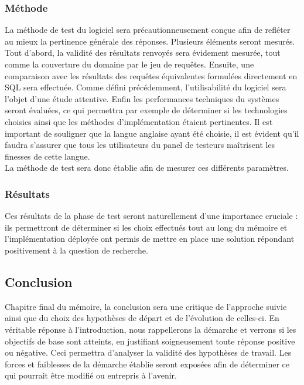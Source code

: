 \documentclass[a4paper,12pt]{article}
\begin{document}
\subsubsection{Méthode}
La méthode de test du logiciel sera précautionneusement conçue afin de refléter au mieux la pertinence générale des réponses.
Plusieurs éléments seront mesurés.
Tout d'abord, la validité des résultats renvoyés sera évidement mesurée, tout comme la couverture du domaine par le jeu de requêtes.
Ensuite, une comparaison avec les résultats des requêtes équivalentes formulées directement en SQL sera effectuée.
Comme défini précédemment, l'utilisabilité du logiciel sera l'objet d'une étude attentive.
Enfin les performances techniques du systèmes seront évaluées, ce qui permettra par exemple de déterminer si les technologies choisies ainsi que les méthodes d'implémentation étaient pertinentes.
Il est important de souligner que la langue anglaise ayant été choisie, il est évident qu'il faudra s'assurer que tous les utilisateurs du panel de testeurs maîtrisent les finesses de cette langue. \\

La méthode de test sera donc établie afin de mesurer ces différents paramètres.
\subsubsection{Résultats}
Ces résultats de la phase de test seront naturellement d'une importance cruciale : ils permettront de déterminer si les choix effectués tout au long du mémoire et l'implémentation déployée ont permis de mettre en place une solution répondant positivement à la question de recherche.
\subsection{Conclusion}
Chapitre final du mémoire, la conclusion sera une critique de l'approche suivie ainsi que du choix des hypothèses de départ et de l'évolution de celles-ci.
En véritable réponse à l'introduction, nous rappellerons la démarche et verrons si les objectifs de base sont atteints, en justifiant soigneusement toute réponse positive ou négative.
Ceci permettra d'analyser la validité des hypothèses de travail.
Les forces et faiblesses de la démarche établie seront exposées afin de déterminer ce qui pourrait être modifié ou entrepris à l'avenir. 
\newpage
\end{document}
